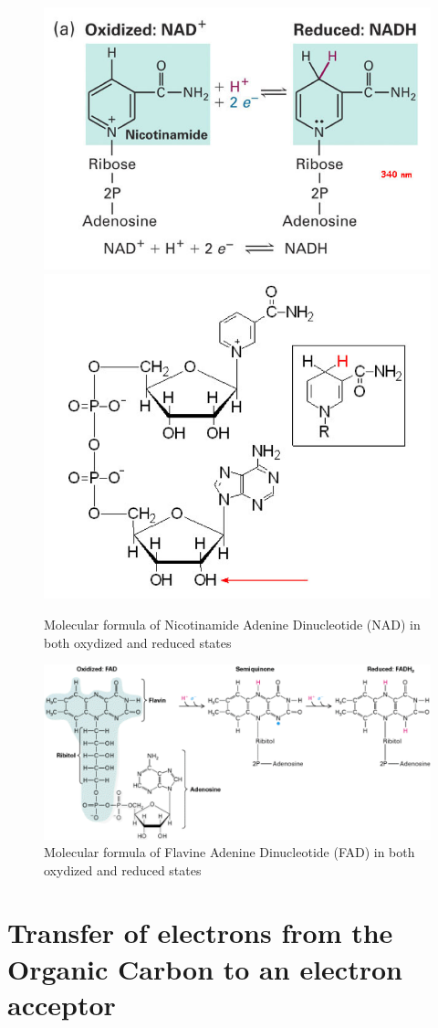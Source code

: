 \documentclass[]{book}
\theoremstyle{definition}
\theoremstyle{definition}
\theoremstyle{definition}
\theoremstyle{remark}
\begin{document}
\begin{figure}

{\centering \includegraphics[width=0.45\linewidth]{pictures/NADreduction} \includegraphics[width=0.45\linewidth]{pictures/NADfull} 

}

\caption{Molecular formula of Nicotinamide Adenine Dinucleotide (NAD) in both oxydized and reduced states}\label{fig:NAD}
\end{figure}

\begin{figure}

{\centering \includegraphics[width=1\linewidth]{pictures/FAD} 

}

\caption{Molecular formula of Flavine Adenine Dinucleotide (FAD) in both oxydized and reduced states}\label{fig:FAD}
\end{figure}

\section{Transfer of electrons from the Organic Carbon to an electron
acceptor}\label{transfer-of-electrons-from-the-organic-carbon-to-an-electron-acceptor}
\end{document}
